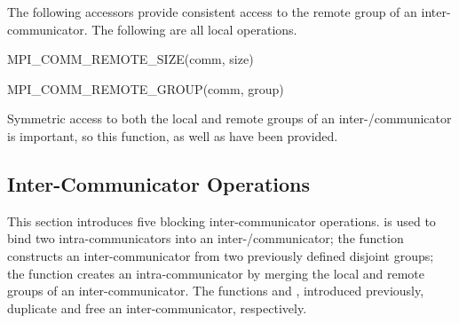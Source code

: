 The following accessors provide consistent access to the remote group of
an inter-communicator.
The following are all local operations.

%
\begin{funcdef}{MPI\_COMM\_REMOTE\_SIZE}{(\mbox{comm}, \mbox{size})}
\end{funcdef}

%
%
\begin{funcdef}{MPI\_COMM\_REMOTE\_GROUP}{(\mbox{comm}, \mbox{group})}
\end{funcdef}

\begin{rationale}
Symmetric access to both the local and remote groups of an inter\hyphen/communicator
is important, so this function, as well as  have
been provided.
\end{rationale}



\subsection{Inter-Communicator Operations}
\label{subsec:context-intercomm}

This section introduces five blocking inter-communicator operations.
 is used to bind %
two intra-communicators into an inter\hyphen/communicator; the function
 constructs an inter-communicator
from two previously defined disjoint groups; the function
 creates an intra-communicator by
merging the local and remote groups of an inter-communicator. The
functions \linebreak[3] and
\linebreak[3], introduced previously,
duplicate and free an inter-communicator, respectively.

